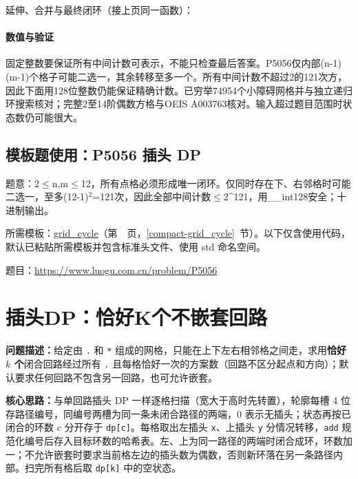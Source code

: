 \newpage

延伸、合并与最终闭环（接上页同一函数）：



\newpage

\paragraph{数值与验证} 固定整数要保证所有中间计数可表示，不能只检查最后答案。P5056仅内部(n-1)(m-1)个格子可能二选一，其余转移至多一个。所有中间计数不超过2的121次方，因此下面用128位整数仍能保证精确计数。已穷举74954个小障碍网格并与独立递归环搜索核对；完整2至14阶偶数方格与OEIS A003763核对。输入超过题目范围时状态数仍可能很大。

\Needspace{367pt}

\subsection*{模板题使用：P5056 插头 DP}

\label{usage-example-396}

题意：2$\le$n,m$\le$12，所有点格必须形成唯一闭环。仅同时存在下、右邻格时可能二选一，至多(12-1)$^{2}$=121次，因此全部中间计数$\le$2\textasciicircum{}121，用\_\_int128安全；十进制输出。

所需模板：\hyperref[compact-grid_cycle]{grid\_\allowbreak{}cycle}（第~\pageref{compact-grid_cycle}~页，\ref{compact-grid_cycle}~节）。以下仅含使用代码，默认已粘贴所需模板并包含标准头文件、使用 std 命名空间。

题目：\url{https://www.luogu.com.cn/problem/P5056}



\newpage

\section{插头DP：恰好K个不嵌套回路}\label{compact-grid_cycles}

\noindent\textbf{问题描述：}\allowbreak 给定由 \texttt{.} 和 \texttt{*} 组成的网格，只能在上下左右相邻格之间走，求用\textbf{恰好 $k$ 个}闭合回路经过所有 \texttt{.} 且每格恰好一次的方案数（回路不区分起点和方向）；默认要求任何回路不包含另一回路，也可允许嵌套。

\textbf{核心思路：}\allowbreak 与单回路插头 DP 一样逐格扫描（宽大于高时先转置），轮廓每槽 4 位存路径编号，同编号两槽为同一条未闭合路径的两端，0 表示无插头；状态再按已闭合的环数 $c$ 分开存于 \texttt{dp[c]}。每格取出左插头 \texttt{x}、上插头 \texttt{y} 分情况转移，\texttt{add} 规范化编号后存入目标环数的哈希表。左、上为同一路径的两端时闭合成环，环数加一；不允许嵌套时要求当前格左边的插头数为偶数，否则新环落在另一条路径内部。扫完所有格后取 \texttt{dp[k]} 中的空状态。


